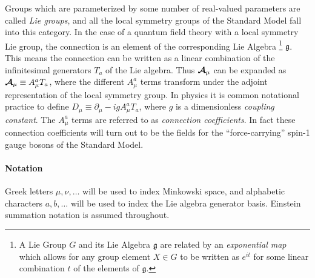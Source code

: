 
Groups which are parameterized by some number of real-valued parameters are called \textit{Lie groups}, and all the local symmetry groups of the Standard Model fall into this category.
In the case of a quantum field theory with a local symmetry Lie group, the connection is an element of the corresponding Lie Algebra \footnote{A Lie Group $G$ and its Lie Algebra $\mathfrak{g}$ are related by an \textit{exponential map} which allows for any group element $X \in G$ to be written as $e^{it}$ for some linear combination $t$ of the elements of $\mathfrak{g}$.} $\mathfrak{g}$.
This means the connection can be written as a linear combination of the infinitesimal generators $T_a$ of the Lie algebra.
Thus $ \boldsymbol{\mathcal{A}} _\mu$ can be expanded as $ \boldsymbol{\mathcal{A}} _\mu \equiv A_\mu^a T_a$, where the different $A_\mu^a$ terms transform under the adjoint representation of the local symmetry group.
In physics it is common notational practice to define $D_\mu \equiv \partial_\mu - igA_\mu^aT_a$, where $g$ is a dimensionless \textit{coupling constant}.
The $A_\mu^a$ terms are referred to as \textit{connection coefficients}.
In fact these connection coefficients will turn out to be the fields for the ``force-carrying'' spin-1 gauge bosons of the Standard Model.

\begin{tcolorbox}
\paragraph{Notation} Greek letters $\mu,\nu,\dots$ will be used to index Minkowski space, and alphabetic characters $a,b,\dots$ will be used to index the Lie algebra generator basis.
Einstein summation notation is assumed throughout.
\end{tcolorbox}


